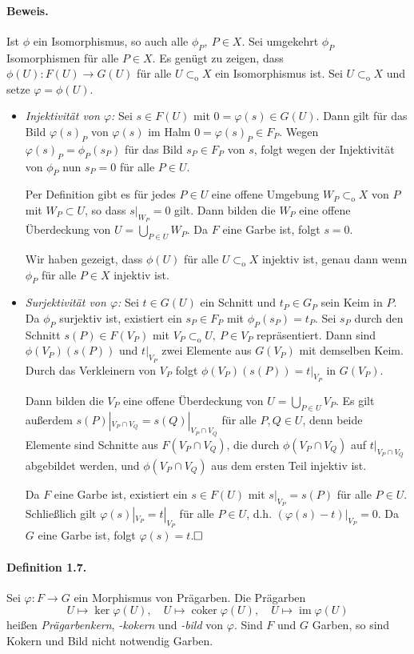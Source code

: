 \documentclass[11pt,b5paper,openany]{memoir}
\def \qed {$\hfill\square$}
\begin{document}
\paragraph{Beweis.} Ist $\phi$ ein Isomorphismus, so auch alle $\phi_P,\ P\in X$. Sei umgekehrt $\phi_P$ Isomorphismen für alle $P\in X$. Es genügt zu zeigen, dass $\phi(U):F(U)\to G(U)$ für alle $U\subset_\text{o}X$ ein Isomorphismus ist. Sei $U\subset_\text{o}X$ und setze $\varphi=\phi(U)$.
\begin{itemize}
\item \textit{Injektivität von $\varphi$:} Sei $s\in F(U)$ mit $0=\varphi(s)\in G(U)$. Dann gilt für das Bild $\varphi(s)_P$ von $\varphi(s)$ im Halm $0=\varphi(s)_P\in F_P$. Wegen $\varphi(s)_P=\phi_P(s_P)$ für das Bild $s_P\in F_P$ von $s$, folgt wegen der Injektivität von $\phi_P$ nun $s_P=0$ für alle $P\in U$. 

Per Definition gibt es für jedes $P\in U$ eine offene Umgebung $W_P\subset_\text{o}X$ von $P$ mit $W_P\subset U$, so dass $s|_{W_P}=0$ gilt. Dann bilden die $W_P$ eine offene Überdeckung von $U=\bigcup_{P\in U}W_P$. Da $F$ eine Garbe ist, folgt $s=0$.

Wir haben gezeigt, dass $\phi(U)$ für alle $U\subset_\text{o}X$ injektiv ist, genau dann wenn $\phi_P$ für alle $P\in X$ injektiv ist.
\item \textit{Surjektivität von $\varphi$:} Sei $t\in G(U)$ ein Schnitt und $t_P\in G_P$ sein Keim in $P$. Da $\phi_P$ surjektiv ist, existiert ein $s_P\in F_P$ mit $\phi_P(s_P)=t_P$. Sei $s_P$ durch den Schnitt $s(P)\in F(V_P)$ mit $V_P\subset_\text{o}U,\ P\in V_P$ repräsentiert. Dann sind $\phi(V_P)(s(P))$ und $t|_{V_P}$ zwei Elemente aus $G(V_P)$ mit demselben Keim. Durch das Verkleinern von $V_P$ folgt $\phi(V_P)(s(P))=t|_{V_P}$ in $G(V_P)$.

Dann bilden die $V_P$ eine offene Überdeckung von $U=\bigcup_{P\in U}V_P$. Es gilt außerdem $s(P)|_{V_P\cap V_Q}=s(Q)|_{V_P\cap V_Q}$ für alle $P,Q\in U$, denn beide Elemente sind Schnitte aus $F(V_P\cap V_Q)$, die durch $\phi(V_P\cap V_Q)$ auf $t|_{V_P\cap V_Q}$ abgebildet werden, und $\phi(V_P\cap V_Q)$ aus dem ersten Teil injektiv ist.

Da $F$ eine Garbe ist, existiert ein $s\in F(U)$ mit $s|_{V_P}=s(P)$ für alle $P\in U$. Schließlich gilt $\varphi(s)|_{V_P}=t|_{V_P}$ für alle $P\in U$, d.h. $(\varphi(s)-t)|_{V_P}=0$. Da $G$ eine Garbe ist, folgt $\varphi(s)=t$.\qed
\end{itemize}

\paragraph{Definition 1.7.}\label{1.7} Sei $\varphi:F\to G$ ein Morphismus von Prägarben. Die Prägarben
\[U\mapsto \ker\varphi(U),\quad U\mapsto\operatorname{coker}\varphi(U),\quad U\mapsto\operatorname{im}\varphi(U) \]
heißen \textit{Prägarbenkern}, \textit{-kokern} und \textit{-bild} von $\varphi$. Sind $F$ und $G$ Garben, so sind Kokern und Bild nicht notwendig Garben.
\end{document}
